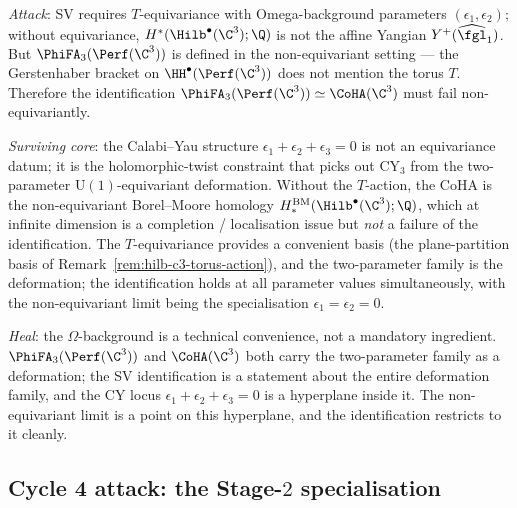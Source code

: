 \begin{remark}
\label{rem:cycle-3-attack-heal-wave10}
\emph{Attack}: SV requires $T$-equivariance with Omega-background
parameters $(\epsilon_1, \epsilon_2)$; without equivariance,
$H^*(\Hilb^\bullet(\C^3); \Q)$ is not the affine Yangian
$Y^+(\widehat{\fgl}_1)$. But $\PhiFA_3(\Perf(\C^3))$ is defined in
the non-equivariant setting — the Gerstenhaber bracket on
$\HH^\bullet(\Perf(\C^3))$ does not mention the torus $T$. Therefore
the identification
$\PhiFA_3(\Perf(\C^3)) \simeq \CoHA(\C^3)$ must fail non-equivariantly.

\emph{Surviving core}: the Calabi--Yau structure $\epsilon_1 +
\epsilon_2 + \epsilon_3 = 0$ is not an equivariance datum; it is the
holomorphic-twist constraint that picks out CY$_3$ from the
two-parameter $\mathrm{U}(1)$-equivariant deformation. Without the
$T$-action, the CoHA is the non-equivariant Borel--Moore homology
$H^{\mathrm{BM}}_*(\Hilb^\bullet(\C^3); \Q)$, which at infinite
dimension is a completion / localisation issue but \emph{not} a
failure of the identification. The $T$-equivariance provides a
convenient basis (the plane-partition basis of
Remark~\ref{rem:hilb-c3-torus-action}), and the two-parameter family
is the deformation; the identification holds at all parameter values
simultaneously, with the non-equivariant limit being the specialisation
$\epsilon_1 = \epsilon_2 = 0$.

\emph{Heal}: the $\Omega$-background is a technical convenience, not
a mandatory ingredient. $\PhiFA_3(\Perf(\C^3))$ and $\CoHA(\C^3)$
both carry the two-parameter family as a deformation; the SV
identification is a statement about the entire deformation family,
and the CY locus $\epsilon_1 + \epsilon_2 + \epsilon_3 = 0$ is a
hyperplane inside it. The non-equivariant limit is a point on this
hyperplane, and the identification restricts to it cleanly.
\end{remark}

\subsection*{Cycle 4 attack: the Stage-$2$ specialisation}

